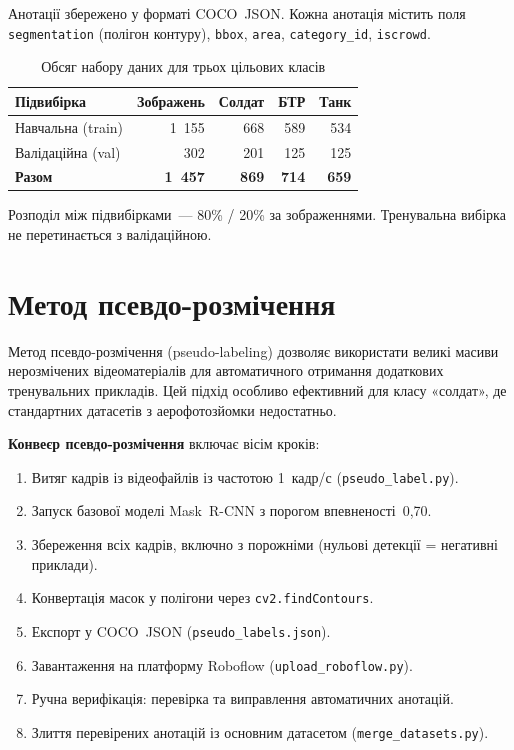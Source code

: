 \documentclass[14pt,a4paper]{extreport}
\begin{document}
Анотації збережено у форматі COCO~JSON. Кожна анотація містить поля
\texttt{segmentation} (полігон контуру), \texttt{bbox}, \texttt{area},
\texttt{category\_id}, \texttt{iscrowd}.

\begin{table}[H]
\caption{Обсяг набору даних для трьох цільових класів}
\label{tab:dataset}
\centering
\begin{tabular}{@{}lrrrr@{}}
\toprule
Підвибірка & Зображень & Солдат & БТР & Танк \\
\midrule
Навчальна (train) & 1~155 & 668 & 589 & 534 \\
Валідаційна (val) & 302 & 201 & 125 & 125 \\
\textbf{Разом} & \textbf{1~457} & \textbf{869} & \textbf{714} & \textbf{659} \\
\bottomrule
\end{tabular}
\end{table}

Розподіл між підвибірками~--- 80\% / 20\% за зображеннями. Тренувальна
вибірка не перетинається з валідаційною.

\section{Метод псевдо-розмічення}

Метод псевдо-розмічення (pseudo-labeling) дозволяє використати великі
масиви нерозмічених відеоматеріалів для автоматичного отримання
додаткових тренувальних прикладів. Цей підхід особливо ефективний для
класу «солдат», де стандартних датасетів з аерофотозйомки недостатньо.

\textbf{Конвеєр псевдо-розмічення} включає вісім кроків:

\begin{enumerate}
  \item Витяг кадрів із відеофайлів із частотою 1~кадр/с
        (\texttt{pseudo\_label.py}).
  \item Запуск базової моделі Mask~R-CNN з порогом впевненості~0{,}70.
  \item Збереження всіх кадрів, включно з порожніми (нульові детекції
        = негативні приклади).
  \item Конвертація масок у полігони через \texttt{cv2.findContours}.
  \item Експорт у COCO~JSON (\texttt{pseudo\_labels.json}).
  \item Завантаження на платформу Roboflow (\texttt{upload\_roboflow.py}).
  \item Ручна верифікація: перевірка та виправлення автоматичних анотацій.
  \item Злиття перевірених анотацій із основним датасетом
        (\texttt{merge\_\allowbreak datasets.py}).
\end{enumerate}
\end{document}

